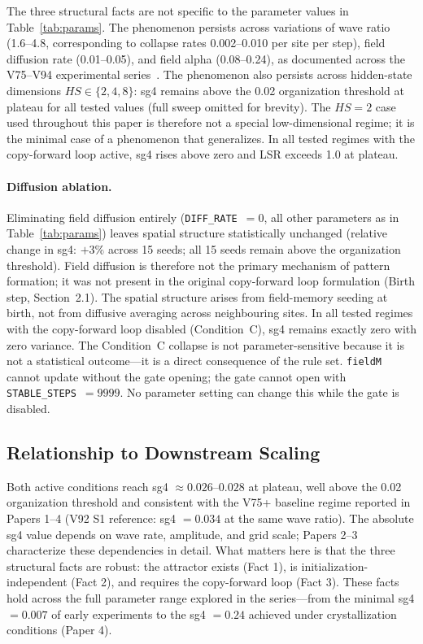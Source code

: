 \documentclass[11pt,twocolumn]{article}
\begin{document}
The three structural facts are not specific to the parameter values in
Table~\ref{tab:params}.
The phenomenon persists across variations of wave ratio (1.6--4.8,
corresponding to collapse rates 0.002--0.010 per site per step),
field diffusion rate (0.01--0.05), and field alpha (0.08--0.24),
as documented across the V75--V94 experimental series~\cite{aubin2026propagation}.
The phenomenon also persists across hidden-state dimensions
$HS \in \{2, 4, 8\}$: sg4 remains above the 0.02 organization threshold
at plateau for all tested values (full sweep omitted for brevity).
The $HS = 2$ case used throughout this paper is therefore not a special
low-dimensional regime; it is the minimal case of a phenomenon that generalizes.
In all tested regimes with the copy-forward loop active, sg4 rises above zero
and LSR exceeds 1.0 at plateau.

\paragraph{Diffusion ablation.}
Eliminating field diffusion entirely (\texttt{DIFF\_RATE}~$= 0$, all other
parameters as in Table~\ref{tab:params}) leaves spatial structure statistically
unchanged (relative change in sg4: $+3\%$ across 15 seeds;
all 15 seeds remain above the organization threshold).
Field diffusion is therefore not the primary mechanism of pattern formation;
it was not present in the original copy-forward loop formulation
(Birth step, Section~2.1).
The spatial structure arises from field-memory seeding at birth, not
from diffusive averaging across neighbouring sites.
In all tested regimes with the copy-forward loop disabled (Condition~C),
sg4 remains exactly zero with zero variance.
The Condition~C collapse is not parameter-sensitive because it is not a
statistical outcome---it is a direct consequence of the rule set.
\texttt{fieldM} cannot update without the gate opening; the gate cannot open
with \texttt{STABLE\_STEPS}~$= 9999$. No parameter setting can change this
while the gate is disabled.

\subsection{Relationship to Downstream Scaling}

Both active conditions reach sg4 $\approx 0.026$--$0.028$ at plateau, well
above the 0.02 organization threshold and consistent with the V75+ baseline
regime reported in Papers 1--4 (V92 S1 reference: sg4 $= 0.034$ at the same
wave ratio). The absolute sg4 value depends on wave rate, amplitude, and grid
scale; Papers 2--3 characterize these dependencies in detail. What matters here
is that the three structural facts are robust: the attractor exists (Fact 1),
is initialization-independent (Fact 2), and requires the copy-forward loop
(Fact 3). These facts hold across the full parameter range explored in the
series---from the minimal sg4 $= 0.007$ of early experiments to the
sg4 $= 0.24$ achieved under crystallization conditions (Paper 4).
\end{document}
